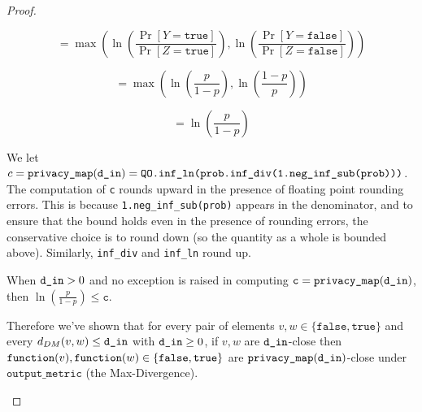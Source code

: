 \documentclass{article}
\begin{document}
\begin{proof}
\begin{enumerate}
    \[
    = \max\left(\ln (\frac{\Pr[Y = \texttt{true}]}{\Pr[Z = \texttt{true}]}), \ln(\frac{\Pr[Y = \texttt{false}]}{\Pr[Z = \texttt{false}]})\right)
    \]
    
    \[
    = \max\left(\ln (\frac{p}{1 - p}), \ln(\frac{1 - p}{p})\right)
    \]
    
    \[
    = \ln (\frac{p}{1 - p})
    \]

    We let $c = \texttt{privacy\_map}(\texttt{d\_in}) = \texttt{QO.inf\_ln(prob.inf\_div(1.neg\_inf\_sub(prob)))}$.
    The computation of \texttt{c} rounds upward in the presence of floating point rounding errors. 
    This is because \texttt{1.neg\_inf\_sub(prob)} appears in the denominator, and to ensure that the bound holds even in the presence of rounding errors, the conservative choice is to round down (so the quantity as a whole is bounded above). 
    Similarly, \texttt{inf\_div} and \texttt{inf\_ln} round up. 
    
    When $\texttt{d\_in} > 0$ and no exception is raised in computing $\texttt{c} = \texttt{privacy\_map}(\texttt{d\_in})$, then $\ln\left(\frac{p}{1 - p}\right) \leq \texttt{c}$. 
    
    Therefore we've shown that for every pair of elements $v,w \in \{\texttt{false}, \texttt{true}\}$ and every $d_{DM}(v,w) \le \texttt{d\_in}$ with $\texttt{d\_in} \ge 0$, 
    if $v,w$ are $\texttt{d\_in}$-close then $\texttt{function}(v),\texttt{function}(w) \in \{\texttt{false},\texttt{true}\}$ are $\texttt{privacy\_map}(\texttt{d\_in})$-close under $\texttt{output\_metric}$ (the Max-Divergence).
\end{enumerate}
\end{proof}
\end{document}
